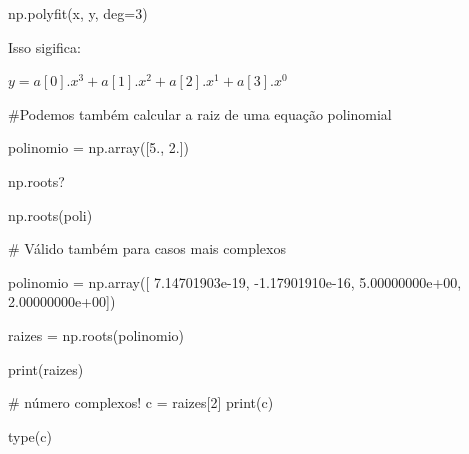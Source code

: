 \documentclass[
  letterpaper,
  DIV=11,
  numbers=noendperiod]{scrreprt}
\newenvironment{Shaded}{\begin{snugshade}}{\end{snugshade}}
\newcommand{\NormalTok}[1]{\textcolor[rgb]{0.00,0.23,0.31}{#1}}
\begin{document}
\begin{Shaded}
\begin{Highlighting}[]
\NormalTok{np.polyfit(x, y, deg=3)}
\end{Highlighting}
\end{Shaded}

Isso sigifica:

\(y = a[0].x^3 + a[1].x^2 + a[2].x^1 + a[3].x^0\)

\begin{Shaded}
\begin{Highlighting}[]
\NormalTok{\#Podemos também calcular a raiz de uma equação polinomial}

\NormalTok{polinomio = np.array([5., 2.])}
\end{Highlighting}
\end{Shaded}

\begin{Shaded}
\begin{Highlighting}[]
\NormalTok{np.roots?}
\end{Highlighting}
\end{Shaded}

\begin{Shaded}
\begin{Highlighting}[]
\NormalTok{np.roots(poli)}
\end{Highlighting}
\end{Shaded}

\begin{Shaded}
\begin{Highlighting}[]
\NormalTok{\# Válido também para casos mais complexos}

\NormalTok{polinomio = np.array([ 7.14701903e{-}19, {-}1.17901910e{-}16,  5.00000000e+00,  2.00000000e+00])}

\NormalTok{raizes = np.roots(polinomio)}

\NormalTok{print(raizes)}
\end{Highlighting}
\end{Shaded}

\begin{Shaded}
\begin{Highlighting}[]
\NormalTok{\# número complexos!}
\NormalTok{c = raizes[2]}
\NormalTok{print(c)}
\end{Highlighting}
\end{Shaded}

\begin{Shaded}
\begin{Highlighting}[]
\NormalTok{type(c)}
\end{Highlighting}
\end{Shaded}
\end{document}
